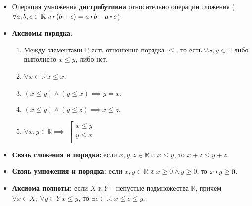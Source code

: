 \documentclass{article}
\begin{document}
\begin{itemize}[leftmargin=*]
\begin{enumerate}[label=$\arabic*_{\dt}$]
    \end{enumerate}
    \item Операция умножения \textbf{дистрибутивна} относительно операции сложения (\(\forall a, b, c \in \mathbb{R}\ a \dt (b + c) = a \dt b + a \dt c\)).
    \item \textbf{Аксиомы порядка.} 
    \begin{enumerate}[label=$\arabic*_{\leq}$]
        \item Между элементами \(\mathbb{R}\) есть отношение порядка \(\leq\), то есть \(\forall x, y \in \mathbb{R}\) либо выполнено \(x \leq y\), либо нет.
        \item \(\forall x \in \mathbb{R}\ x \leq x\). 
        \item \((x \leq y) \land (y \leq x) \implies y = x\).
        \item \((x \leq y) \land (y \leq z) \implies x \leq z\).
        \item \(\forall x, y \in \mathbb{R} \implies \) 
        \(\left[ 
            \begin{gathered}
                x \leq y\\
                y \leq x\\
            \end{gathered}
        \right.\)   
    \end{enumerate}
    \item \textbf{Связь сложения и порядка:} если \(x, y, z \in \mathbb{R}\) и \(x \leq y\), то \(x + z \leq y + z\).
    \item \textbf{Свзяь умножения и порядка:} если \(x, y \in \mathbb{R}\) и \(x \geq 0 \land y \geq 0\), то \(x \dt y \geq 0\).      
    \item \textbf{Аксиома полноты:} если \(X\) и \(Y\) -- непустые подмножества \(\mathbb{R}\), причем \(\forall x \in X,\ \forall y \in Y\ x \leq y\), то \(\exists c \in \mathbb{R}: x \leq c \leq y\).     
\end{itemize}

\end{document}
